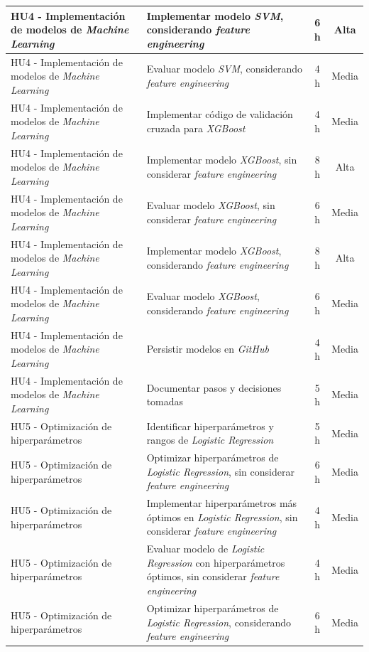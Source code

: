 \documentclass[
11pt, %
]{charter}
\begin{document}
\begin{xltabular}{\linewidth}{@{}|X|X|c|c|@{}}
HU4 - Implementación de modelos de \textit{Machine Learning} & Implementar modelo \textit{SVM}, considerando \textit{feature engineering} & 6 h & Alta \\ \hline
HU4 - Implementación de modelos de \textit{Machine Learning} & Evaluar modelo \textit{SVM}, considerando \textit{feature engineering} & 4 h & Media \\ \hline
HU4 - Implementación de modelos de \textit{Machine Learning} & Implementar código de validación cruzada para \textit{XGBoost} & 4 h & Media \\ \hline
HU4 - Implementación de modelos de \textit{Machine Learning} & Implementar modelo \textit{XGBoost}, sin considerar \textit{feature engineering} & 8 h & Alta \\ \hline
HU4 - Implementación de modelos de \textit{Machine Learning} & Evaluar modelo \textit{XGBoost}, sin considerar \textit{feature engineering} & 6 h & Media \\ \hline
HU4 - Implementación de modelos de \textit{Machine Learning} & Implementar modelo \textit{XGBoost}, considerando \textit{feature engineering} & 8 h & Alta \\ \hline
HU4 - Implementación de modelos de \textit{Machine Learning} & Evaluar modelo \textit{XGBoost}, considerando \textit{feature engineering} & 6 h & Media \\ \hline
HU4 - Implementación de modelos de \textit{Machine Learning} & Persistir modelos en \textit{GitHub} & 4 h & Media \\ \hline
HU4 - Implementación de modelos de \textit{Machine Learning} & Documentar pasos y decisiones tomadas & 5 h & Media \\ \hline
HU5 - Optimización de hiperparámetros & Identificar hiperparámetros y rangos de \textit{Logistic Regression} & 5 h & Media \\ \hline
HU5 - Optimización de hiperparámetros & Optimizar hiperparámetros de \textit{Logistic Regression}, sin considerar \textit{feature engineering} & 6 h & Media \\ \hline
HU5 - Optimización de hiperparámetros & Implementar hiperparámetros más óptimos en \textit{Logistic Regression}, sin considerar \textit{feature engineering} & 4 h & Media \\ \hline
HU5 - Optimización de hiperparámetros & Evaluar modelo de \textit{Logistic Regression} con hiperparámetros óptimos, sin considerar \textit{feature engineering} & 4 h & Media \\ \hline
HU5 - Optimización de hiperparámetros & Optimizar hiperparámetros de \textit{Logistic Regression}, considerando \textit{feature engineering} & 6 h & Media \\ \hline

\end{xltabular}
\end{document}
